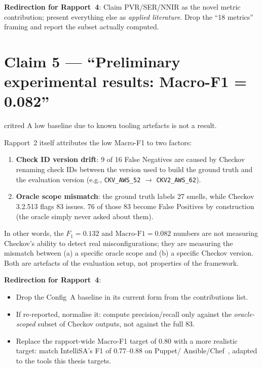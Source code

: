 \documentclass[11pt, a4paper]{report}
\begin{document}
\textbf{Redirection for Rapport~4}: Claim PVR/SER/NNIR as the novel
metric contribution; present everything else as \emph{applied literature}.
Drop the ``18 metrics'' framing and report the subset actually computed.

\section{Claim 5 --- ``Preliminary experimental results: Macro-F1 = 0.082''}

\begin{gradebox}{critred}
A low baseline due to known tooling artefacts is not a result.
\end{gradebox}

Rapport~2 itself attributes the low Macro-F1 to two factors:

\begin{enumerate}
  \item \textbf{Check ID version drift}: 9 of 16 False Negatives are caused
        by Checkov renaming check IDs between the version used to build the
        ground truth and the evaluation version (e.g.,
        \texttt{CKV\_AWS\_52} $\to$ \texttt{CKV2\_AWS\_62}).
  \item \textbf{Oracle scope mismatch}: the ground truth labels 27 smells,
        while Checkov 3.2.513 flags 83 issues. 76 of those 83 become False
        Positives by construction (the oracle simply never asked about them).
\end{enumerate}

In other words, the $F_1=0.132$ and $\text{Macro-F1}=0.082$ numbers
are not measuring Checkov's ability to detect real misconfigurations;
they are measuring the mismatch between (a) a specific oracle scope and
(b) a specific Checkov version. Both are artefacts of the evaluation
setup, not properties of the framework.

\textbf{Redirection for Rapport~4}:

\begin{itemize}
  \item Drop the Config~A baseline in its current form from the
        contributions list.
  \item If re-reported, normalise it: compute precision/recall only
        against the \emph{oracle-scoped} subset of Checkov outputs,
        not against the full 83.
  \item Replace the rapport-wide Macro-F1 target of 0.80 with a more
        realistic target: match IntelliSA's F1 of 0.77--0.88 on Puppet/
        Ansible/Chef~\citep{intellisa2026}, adapted to the tools this
        thesis targets.
\end{itemize}
\end{document}
